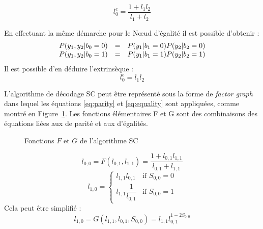 \begin{equation}
l^e_0=\dfrac{1 + l_1l_2}{l_1+l_2}
\label{eq:parity}
\end{equation}

En effectuant la même démarche pour le N\oe{}ud d'égalité il est possible d'obtenir :
\begin{eqnarray*}
\begin{array}{r c l}
P(y_1,y_2|b_0=0) & = & P(y_1|b_1=0) P(y_2 | b_2 = 0) \\
P(y_1,y_2|b_0=1) & = & P(y_1|b_1=1) P(y_2 | b_2 = 1) 
\end{array}
\end{eqnarray*}
Il est possible d'en déduire l'extrinsèque :
\begin{equation}
l^e_0=l_1l_2
\label{eq:equality}
\end{equation}

L'algorithme de décodage SC peut être représenté sous la forme de \textit{factor graph} dans lequel les équations \ref{eq:parity} et \ref{eq:equality} sont appliquées, comme montré en Figure~\ref{fig:SCSchedule}. Les fonctions élémentaires F et G sont des combinaisons des équations liées aux \noeuds de parité et aux \noeuds d'égalités.
\begin{figure}[t]
  \centering
  \quad\quad\quad\quad
  \caption{Fonctions $F$ et $G$ de l'algorithme SC}
  \label{fig:SCSchedule}
\end{figure}
\begin{equation}
l_{0,0} = F(l_{0,1}, l_{1,1}) = \dfrac{1+l_{0,1}l_{1,1}}{l_{0,1}+l_{1,1}}
\end{equation}
\[
	l_{1,0} = 
	\begin{cases} 
	l_{1,1}l_{0,1} & \text{if }S_{0,0} = 0\\
	l_{1,1}\dfrac{1}{l_{0,1}} & \text{if }S_{0,0} = 1
	\end{cases}
\]
Cela peut être simplifié : 
\begin{equation}
l_{1,0} = G(l_{1,1},l_{0,1},S_{0,0}) = l_{1,1}l_{0,1}^{1 - 2S_{0,0}}
\end{equation}

